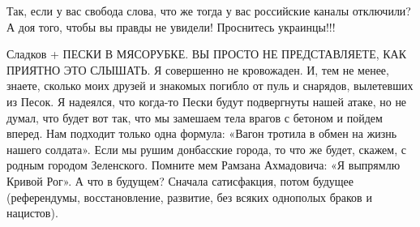 
Так, если у вас свобода слова, что же тогда у вас российские каналы отключили?
А доя того, чтобы вы правды не увидели! Проснитесь украинцы!!!

Сладков +
ПЕСКИ В МЯСОРУБКЕ. ВЫ ПРОСТО НЕ ПРЕДСТАВЛЯЕТЕ, КАК ПРИЯТНО ЭТО СЛЫШАТЬ.
Я совершенно не кровожаден. И, тем не менее, знаете, сколько моих друзей и знакомых погибло от пуль и снарядов, вылетевших из Песок.
Я надеялся, что когда-то Пески будут подвергнуты нашей атаке, но не думал, что будет вот так, что мы замешаем тела врагов с бетоном и пойдем вперед.
Нам подходит только одна формула: «Вагон тротила в обмен на жизнь нашего солдата». Если мы рушим донбасские города, то что же будет, скажем, с родным городом Зеленского.
Помните мем Рамзана Ахмадовича: «Я выпрямлю Кривой Рог». А что в будущем? Сначала сатисфакция, потом будущее (референдумы, восстановление, развитие, без всяких однополых браков и нацистов).

